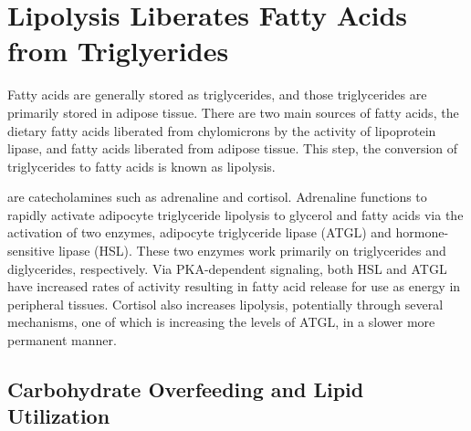 \documentclass{tufte-handout}
\begin{document}
\section{Lipolysis Liberates Fatty Acids from Triglyerides}
Fatty acids are generally stored as triglycerides, and those triglycerides are primarily stored in adipose tissue.  There are two main sources of fatty acids, the dietary fatty acids liberated from chylomicrons by the activity of lipoprotein lipase, and fatty acids liberated from adipose tissue.  This step, the conversion of triglycerides to fatty acids is known as lipolysis.

 are catecholamines such as adrenaline and cortisol.  Adrenaline functions to rapidly activate adipocyte triglyceride lipolysis to glycerol and fatty acids via the activation of two enzymes, adipocyte triglyceride lipase (ATGL) and hormone-sensitive lipase (HSL).  These two enzymes work primarily on triglycerides and diglycerides, respectively.  Via PKA-dependent signaling, both HSL and ATGL have increased rates of activity resulting in fatty acid release for use as energy in peripheral tissues.  Cortisol also increases lipolysis, potentially through several mechanisms, one of which is increasing the levels of ATGL, in a slower more permanent manner.  

\subsection{Carbohydrate Overfeeding and Lipid Utilization}
\end{document}

